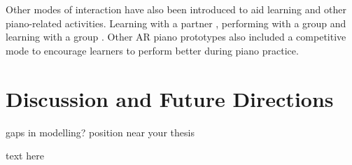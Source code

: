 \documentclass[sigchi, review]{acmart}
\begin{document}
Other modes of interaction have also been introduced to aid learning and other piano-related activities. Learning with a partner \cite{xiao2011duet}, performing with a group \cite{gerry2019adept} and learning with a group \cite{cai2019design}. Other AR piano prototypes also included a competitive mode \cite{cai2019designb} to encourage learners to perform better during piano practice. 

\section{Discussion and Future Directions}
\label{sec: discuss}
gaps in modelling? position near your thesis

text here




\balance


\end{document}
